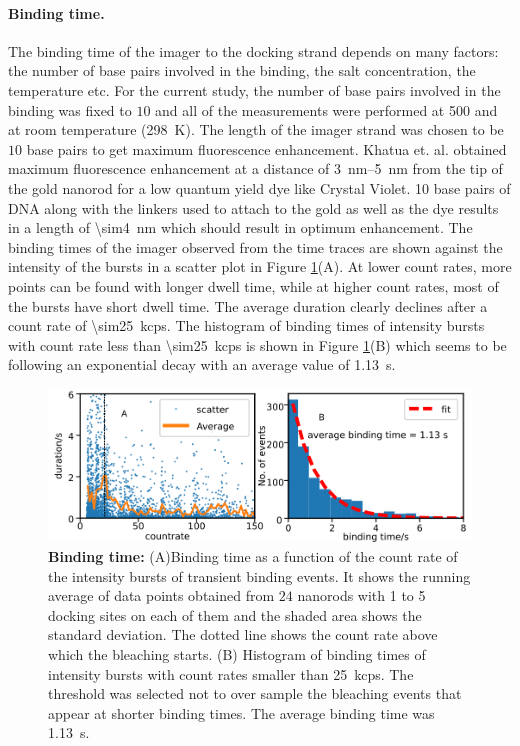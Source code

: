 \paragraph*{Binding time.}
The binding time of the imager to the docking strand depends on many factors: the number of base pairs involved in the binding, the salt concentration, the temperature etc.
For the current study, the number of base pairs involved in the binding was fixed to $10$ and all of the measurements were performed at \SI{500}{\mM}  and at room temperature (\SI{298}{\kelvin}).
The length of the imager strand was chosen to be $10$ base pairs to get maximum fluorescence enhancement.
Khatua et. al. obtained maximum fluorescence enhancement at a distance of \SIrange{3}{5}{\nm} from the tip of the gold nanorod for a low quantum yield dye like Crystal Violet.\cite{khatua2014resonant}
10 base pairs of DNA along with the linkers used to attach to the gold as well as the dye results in a length of \SI{\sim4}{\nm} which should result in optimum enhancement.
The binding times of the imager observed from the time traces are shown against the intensity of the bursts in a scatter plot in Figure \ref{fig:countrate_vs_duration}(A).
At lower count rates, more points can be found with longer dwell time, while at higher count rates, most of the bursts have short dwell time. 
The average duration clearly declines after a count rate of \SI{\sim25}{kcps}.
The histogram of binding times of intensity bursts with count rate less than \SI{\sim25}{kcps} is shown in Figure \ref{fig:countrate_vs_duration}(B) which seems to be following an exponential decay with an average value of \SI{1.13}{\s}.
\begin{figure}[ht]
	\centering
	\includegraphics[width=\textwidth]{countrate_vs_duration_nophtns}
	\caption{\textbf{Binding time:} (A)Binding time as a function of the count rate of the intensity bursts of transient binding events.
	It shows the running average of data points obtained from $24$ nanorods with 1 to 5 docking sites on each of them and the shaded area shows the standard deviation.
	The dotted line shows the count rate above which the bleaching starts.
	(B) Histogram of binding times of intensity bursts with count rates smaller than \SI{25}{ kcps}.
	The threshold was selected not to over sample the bleaching events that appear at shorter binding times.
	The average binding time was \SI{1.13}{\s}.}
  	\label{fig:countrate_vs_duration}
\end{figure}

